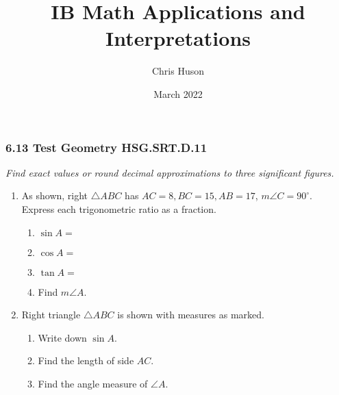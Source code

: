 \documentclass[12pt, twoside]{article}
\title{IB Math Applications and Interpretations}
\author{Chris Huson}
\date{March 2022}
\begin{document}
\subsubsection*{6.13 Test Geometry \hfill HSG.SRT.D.11}
\emph{Find exact values or round decimal approximations to three significant figures.}
\begin{enumerate}
\item As shown, right $\triangle ABC$ has $AC=8, BC=15, AB=17$, $m\angle C=90^\circ$. \\[0.25cm] 
Express each trigonometric ratio as a fraction.
  \begin{multicols}{2}
    \begin{enumerate}[itemsep=0.2cm]
      \item $\sin A =$
      \item $\cos A =$
      \item $\tan A =$
      \item Find $m\angle A$.
    \end{enumerate}
    \begin{center}
    \end{center}
  \end{multicols} \vspace{1cm}

\item Right triangle $\triangle ABC$ is shown with measures as marked.\vspace{0.25cm}
\begin{multicols}{2}
  \begin{enumerate}[itemsep=0.5cm]
    \item Write down $\sin A$.
    \item Find the length of side $AC$.\vspace{1.5cm}
    \item Find the angle measure of $\angle A$.
    \vspace{1cm}
  \end{enumerate}
\begin{flushright}
\end{flushright}
\end{multicols} \vspace{1.5cm}


\end{enumerate}
\end{document}
